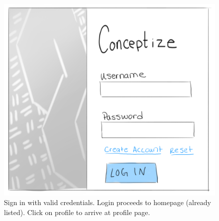 \documentclass[]{article}
\begin{document}
\begin{enumerate}
			\begin{figure}
			  \includegraphics[width=\linewidth]{./pictures/login.png}
			  \caption{Sign in with valid credentials. Login proceeds to homepage (already listed). Click on profile to arrive at profile page.}
			  \label{fig:seller2}
			\end{figure}
			

\end{enumerate}
\end{document}
